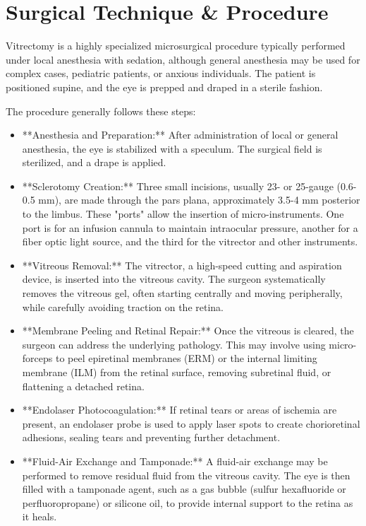 \section*{Surgical Technique \& Procedure}
Vitrectomy is a highly specialized microsurgical procedure typically performed under local anesthesia with sedation, although general anesthesia may be used for complex cases, pediatric patients, or anxious individuals. The patient is positioned supine, and the eye is prepped and draped in a sterile fashion.

The procedure generally follows these steps:

\begin{itemize}
  \item **Anesthesia and Preparation:** After administration of local or general anesthesia, the eye is stabilized with a speculum. The surgical field is sterilized, and a drape is applied.
  
  \item **Sclerotomy Creation:** Three small incisions, usually 23- or 25-gauge (0.6-0.5 mm), are made through the pars plana, approximately 3.5-4 mm posterior to the limbus. These "ports" allow the insertion of micro-instruments. One port is for an infusion cannula to maintain intraocular pressure, another for a fiber optic light source, and the third for the vitrector and other instruments.
  
  \item **Vitreous Removal:** The vitrector, a high-speed cutting and aspiration device, is inserted into the vitreous cavity. The surgeon systematically removes the vitreous gel, often starting centrally and moving peripherally, while carefully avoiding traction on the retina.
  
  \item **Membrane Peeling and Retinal Repair:** Once the vitreous is cleared, the surgeon can address the underlying pathology. This may involve using micro-forceps to peel epiretinal membranes (ERM) or the internal limiting membrane (ILM) from the retinal surface, removing subretinal fluid, or flattening a detached retina.
  
  \item **Endolaser Photocoagulation:** If retinal tears or areas of ischemia are present, an endolaser probe is used to apply laser spots to create chorioretinal adhesions, sealing tears and preventing further detachment.
  
  \item **Fluid-Air Exchange and Tamponade:** A fluid-air exchange may be performed to remove residual fluid from the vitreous cavity. The eye is then filled with a tamponade agent, such as a gas bubble (sulfur hexafluoride or perfluoropropane) or silicone oil, to provide internal support to the retina as it heals.
  

\end{itemize}
